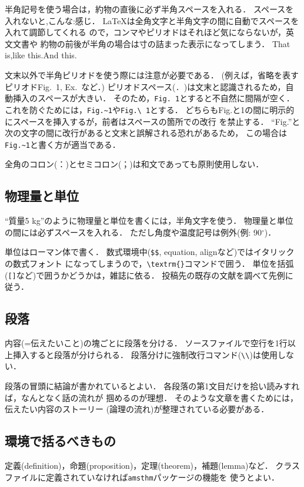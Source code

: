\documentclass[a4paper,10pt,twocolumn,dvipdfmx]{jsarticle}
\theoremstyle{definition}
\begin{document}
半角記号を使う場合は，約物の直後に必ず半角スペースを入れる．
スペースを入れないと,こんな:感じ．
\LaTeX は全角文字と半角文字の間に自動でスペースを入れて調節してくれる
ので，コンマやピリオドはそれほど気にならないが，英文文書や
約物の前後が半角の場合は寸の詰まった表示になってしまう．
That is,like this.And this.

文末以外で半角ピリオドを使う際には注意が必要である．
(例えば，省略を表すピリオドFig.~1, Ex.~など．)
ピリオドスペース(\verb*!. !)は文末と認識されるため，自動挿入のスペースが大きい．
そのため，\verb*!Fig. 1!とすると不自然に間隔が空く．
これを防ぐためには，\verb*!Fig.~1!や\verb*!Fig.\ 1!とする．
どちらもFig.と1の間に明示的にスペースを挿入するが，前者はスペースの箇所での改行
を禁止する．
``Fig.''と次の文字の間に改行があると文末と誤解される恐れがあるため，
この場合は\verb*!Fig.~1!と書く方が適当である．

全角のコロン(：)とセミコロン(；)は和文であっても原則使用しない．


\subsection{物理量と単位}
``質量5 kg''のように物理量と単位を書くには，半角文字を使う．
物理量と単位の間には必ずスペースを入れる．
ただし角度や温度記号は例外(例: 90${}^\circ$)．

単位はローマン体で書く．
数式環境中(\verb!$$!, equation, alignなど)ではイタリックの数式フォント
になってしまうので，\verb*!\textrm{}!コマンドで囲う．
単位を括弧(\verb![]!など)で囲うかどうかは，雑誌に依る．
投稿先の既存の文献を調べて先例に従う．

\subsection{段落}
内容(=伝えたいこと)の塊ごとに段落を分ける．
ソースファイルで空行を1行以上挿入すると段落が分けられる．
段落分けに強制改行コマンド(\verb!\\!)は使用しない．

段落の冒頭に結論が書かれているとよい．
各段落の第1文目だけを拾い読みすれば，なんとなく話の流れが
掴めるのが理想．
そのような文章を書くためには，伝えたい内容のストーリー
(論理の流れ)が整理されている必要がある．

\subsection{環境で括るべきもの}
定義(definition)，命題(proposition)，定理(theorem)，補題(lemma)など．
クラスファイルに定義されていなければ\texttt{amsthm}パッケージの機能を
使うとよい．
\end{document}
